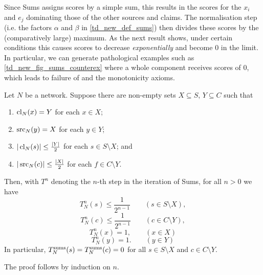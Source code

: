 Since Sums assigns scores by a simple sum, this results in the scores for the
$x_i$ and $e_j$ dominating those of the other sources and claims. The
normalisation step (i.e. the factors $\alpha$ and $\beta$ in
\cref{td_new_def_sums}) then divides these scores by the (comparatively large)
maximum. As the next result shows, under certain conditions this causes scores
to decrease \emph{exponentially} and become $0$ in the limit. In particular, we
can generate pathological examples such as \cref{td_new_fig_sums_counterex}
where a whole component receives scores of 0, which leads to failure of
\disjointindependence{} and the monotonicity axioms.

\begin{proposition}
\label{td_new_prop_obliteration}
    Let $N$ be a network. Suppose there are non-empty sets $X \subseteq S$, $Y
    \subseteq C$ such that
    \begin{enumerate}
        \item $\operatorname{cl}_N(x) = Y$ for each $x \in X$;
        \item $\operatorname{src}_N(y) = X$ for each $y \in Y$;
        \item $|\operatorname{cl}_N(s)| \le \frac{|Y|}{2}$ for each $s \in S \setminus
              X$; and
        \item $|\operatorname{src}_N(c)| \le \frac{|X|}{2}$ for each $f \in C \setminus Y$.
    \end{enumerate}
    Then, with $T^n$ denoting the $n$-th step in the iteration of Sums, for all
    $n > 0$ we have
    \[ T_N^n(s) \le \frac{1}{2^{n-1}} \qquad (s \in S \setminus X), \]
    \[ T_N^n(c) \le \frac{1}{2^{n-1}} \qquad (c \in C \setminus Y), \]
    \[ T_N^n(x) = 1, \qquad (x \in X) \]
    \[ T_N^n(y) = 1. \qquad (y \in Y) \]
    In particular, $T^{\operatorname{sums}}_N(s) = T^{\operatorname{sums}}_N(c) = 0$ for all $s \in S \setminus X$
    and $c \in C \setminus Y$.
\end{proposition}

The proof follows by induction on $n$.



